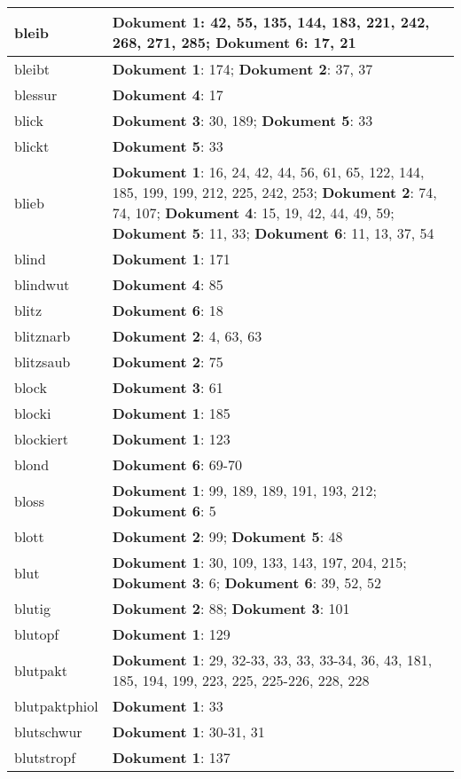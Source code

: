 \documentclass[a5paper]{article}
\begin{document}
\begin{longtable}[l]{|l|p{3in}|}
\hline
bleib & \textbf{Dokument 1}: 42, 55, 135, 144, 183, 221, 242, 268, 271, 285; \textbf{Dokument 6}: 17, 21 \\
\hline
bleibt & \textbf{Dokument 1}: 174; \textbf{Dokument 2}: 37, 37 \\
\hline
blessur & \textbf{Dokument 4}: 17 \\
\hline
blick & \textbf{Dokument 3}: 30, 189; \textbf{Dokument 5}: 33 \\
\hline
blickt & \textbf{Dokument 5}: 33 \\
\hline
blieb & \textbf{Dokument 1}: 16, 24, 42, 44, 56, 61, 65, 122, 144, 185, 199, 199, 212, 225, 242, 253; \textbf{Dokument 2}: 74, 74, 107; \textbf{Dokument 4}: 15, 19, 42, 44, 49, 59; \textbf{Dokument 5}: 11, 33; \textbf{Dokument 6}: 11, 13, 37, 54 \\
\hline
blind & \textbf{Dokument 1}: 171 \\
\hline
blindwut & \textbf{Dokument 4}: 85 \\
\hline
blitz & \textbf{Dokument 6}: 18 \\
\hline
blitznarb & \textbf{Dokument 2}: 4, 63, 63 \\
\hline
blitzsaub & \textbf{Dokument 2}: 75 \\
\hline
block & \textbf{Dokument 3}: 61 \\
\hline
blocki & \textbf{Dokument 1}: 185 \\
\hline
blockiert & \textbf{Dokument 1}: 123 \\
\hline
blond & \textbf{Dokument 6}: 69-70 \\
\hline
bloss & \textbf{Dokument 1}: 99, 189, 189, 191, 193, 212; \textbf{Dokument 6}: 5 \\
\hline
blott & \textbf{Dokument 2}: 99; \textbf{Dokument 5}: 48 \\
\hline
blut & \textbf{Dokument 1}: 30, 109, 133, 143, 197, 204, 215; \textbf{Dokument 3}: 6; \textbf{Dokument 6}: 39, 52, 52 \\
\hline
blutig & \textbf{Dokument 2}: 88; \textbf{Dokument 3}: 101 \\
\hline
blutopf & \textbf{Dokument 1}: 129 \\
\hline
blutpakt & \textbf{Dokument 1}: 29, 32-33, 33, 33, 33-34, 36, 43, 181, 185, 194, 199, 223, 225, 225-226, 228, 228 \\
\hline
blutpaktphiol & \textbf{Dokument 1}: 33 \\
\hline
blutschwur & \textbf{Dokument 1}: 30-31, 31 \\
\hline
blutstropf & \textbf{Dokument 1}: 137 \\

\end{longtable}
\end{document}
